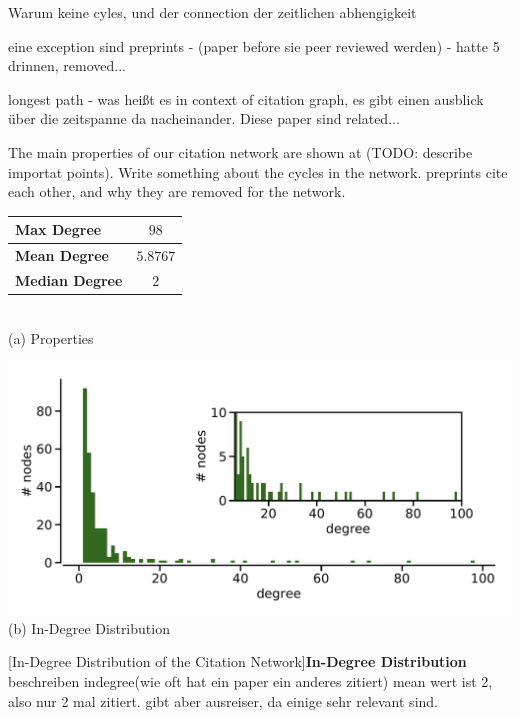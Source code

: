 Warum keine cyles, und der connection der zeitlichen abhengigkeit

eine exception sind preprints - (paper before sie peer reviewed werden) - hatte 5 drinnen, removed...

longest path - was heißt es in context of citation graph, es gibt einen ausblick über die zeitspanne da nacheinander. Diese paper sind related...

The main properties of our citation network are shown at (TODO: describe importat points).
Write something about the cycles in the network. preprints cite each other, and why they are removed for the network.
\begin{minipage}[t]{\textwidth}
  \begin{minipage}[b]{0.39\textwidth}
    \centering
    \begin{tabular}{ l c }
      \toprule
      \textbf{Max Degree}    & $98$     \\ \midrule
      \textbf{Mean Degree}   & $5.8767$ \\ \midrule
      \textbf{Median Degree} & $2$      \\
      \bottomrule
  \end{tabular} \\
  \vspace*{1cm}
  (a) Properties
\end{minipage}
\begin{minipage}[b]{0.59\textwidth}
  \centering
  \includegraphics[width=1.0\textwidth]{figures/in-degree_distribution} \\
  (b) In-Degree Distribution
  \end{minipage}
  [In-Degree Distribution of the Citation Network]{\textbf{In-Degree Distribution} beschreiben indegree(wie oft hat ein paper ein anderes zitiert) mean wert ist 2, also nur 2 mal zitiert. gibt aber ausreiser, da einige sehr relevant sind.}
  \label{fig:indegree_distribution}
\end{minipage}

